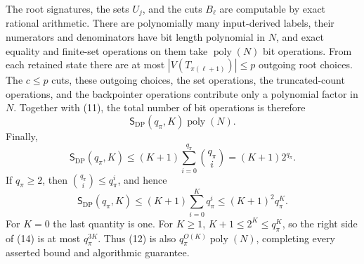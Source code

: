 The root signatures, the sets \(U_j\), and the cuts \(B_\ell\) are computable by exact rational arithmetic.  There are polynomially many input-derived labels, their numerators and denominators have bit length polynomial in \(N\), and exact equality and finite-set operations on them take \(\operatorname{poly}(N)\) bit operations.  From each retained state there are at most \(|V(T_{\pi(\ell+1)})|\leq p\) outgoing root choices.  The \(c\leq p\) cuts, these outgoing choices, the set operations, the truncated-count operations, and the backpointer operations contribute only a polynomial factor in \(N\).  Together with (11), the total number of bit operations is therefore
\[
\mathsf S_{\mathrm{DP}}(q_\pi,K)\operatorname{poly}(N). \tag{12}
\]
Finally,
\[
\mathsf S_{\mathrm{DP}}(q_\pi,K)
\leq (K+1)\sum_{i=0}^{q_\pi}\binom{q_\pi}{i}
=(K+1)2^{q_\pi}. \tag{13}
\]
If \(q_\pi\geq2\), then \(\binom{q_\pi}{i}\leq q_\pi^i\), and hence
\[
\mathsf S_{\mathrm{DP}}(q_\pi,K)
\leq (K+1)\sum_{i=0}^{K}q_\pi^i
\leq (K+1)^2q_\pi^K. \tag{14}
\]
For \(K=0\) the last quantity is one.  For \(K\geq1\), \(K+1\leq2^K\leq q_\pi^K\), so the right side of (14) is at most \(q_\pi^{3K}\).  Thus (12) is also \(q_\pi^{O(K)}\operatorname{poly}(N)\), completing every asserted bound and algorithmic guarantee.
